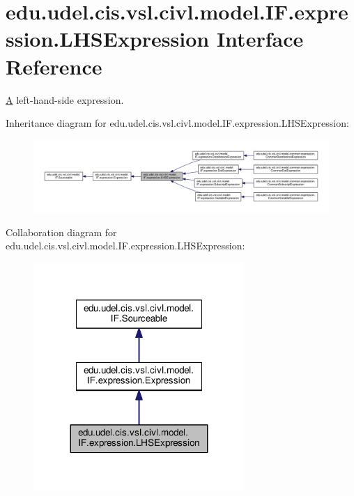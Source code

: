 \hypertarget{interfaceedu_1_1udel_1_1cis_1_1vsl_1_1civl_1_1model_1_1IF_1_1expression_1_1LHSExpression}{}\section{edu.\+udel.\+cis.\+vsl.\+civl.\+model.\+I\+F.\+expression.\+L\+H\+S\+Expression Interface Reference}
\label{interfaceedu_1_1udel_1_1cis_1_1vsl_1_1civl_1_1model_1_1IF_1_1expression_1_1LHSExpression}


\hyperlink{structA}{A} left-\/hand-\/side expression.  




Inheritance diagram for edu.\+udel.\+cis.\+vsl.\+civl.\+model.\+I\+F.\+expression.\+L\+H\+S\+Expression\+:
\nopagebreak
\begin{figure}[H]
\begin{center}
\leavevmode
\includegraphics[width=350pt]{interfaceedu_1_1udel_1_1cis_1_1vsl_1_1civl_1_1model_1_1IF_1_1expression_1_1LHSExpression__inherit__graph}
\end{center}
\end{figure}


Collaboration diagram for edu.\+udel.\+cis.\+vsl.\+civl.\+model.\+I\+F.\+expression.\+L\+H\+S\+Expression\+:
\nopagebreak
\begin{figure}[H]
\begin{center}
\leavevmode
\includegraphics[width=227pt]{interfaceedu_1_1udel_1_1cis_1_1vsl_1_1civl_1_1model_1_1IF_1_1expression_1_1LHSExpression__coll__graph}
\end{center}
\end{figure}
